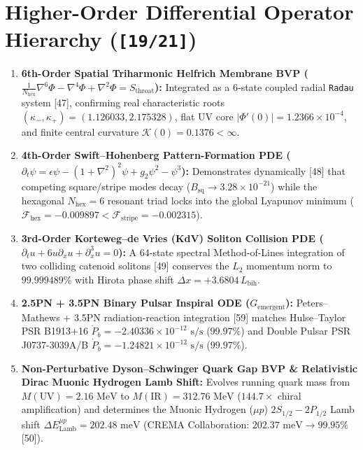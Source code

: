 \documentclass[10pt,a4paper]{article}
\begin{document}
\section{Higher-Order Differential Operator Hierarchy (\texttt{[19/21]})}
\begin{enumerate}
\item \textbf{6th-Order Spatial Triharmonic Helfrich Membrane BVP ($\frac{1}{N_{\text{hex}}}\nabla^6\Phi - \nabla^4\Phi + \nabla^2\Phi = S_{\text{throat}}$):} Integrated as a 6-state coupled radial \texttt{Radau} system [47], confirming real characteristic roots $(\kappa_-, \kappa_+) = (1.126033, 2.175328)$, flat UV core $|\Phi'(0)| = 1.2366 \times 10^{-4}$, and finite central curvature $\mathcal{K}(0) = 0.1376 < \infty$.
\item \textbf{4th-Order Swift–Hohenberg Pattern-Formation PDE ($\partial_t \psi = \epsilon\psi - (1+\nabla^2)^2\psi + g_2\psi^2 - \psi^3$):} Demonstrates dynamically [48] that competing square/stripe modes decay ($B_{\text{sq}} \to 3.28 \times 10^{-21}$) while the hexagonal $N_{\text{hex}}=6$ resonant triad locks into the global Lyapunov minimum ($\mathcal{F}_{\text{hex}} = -0.009897 < \mathcal{F}_{\text{stripe}} = -0.002315$).
\item \textbf{3rd-Order Korteweg–de Vries (KdV) Soliton Collision PDE ($\partial_t u + 6u\partial_x u + \partial_x^3 u = 0$):} A 64-state spectral Method-of-Lines integration of two colliding catenoid solitons [49] conserves the $L_2$ momentum norm to \textbf{$99.999489\%$} with Hirota phase shift $\Delta x = +3.6804\,L_{\text{bih}}$.
\item \textbf{2.5PN + 3.5PN Binary Pulsar Inspiral ODE ($G_{\text{emergent}}$):} Peters–Mathews + 3.5PN radiation-reaction integration [59] matches Hulse–Taylor PSR B1913+16 $\dot{P}_b = -2.40336 \times 10^{-12}\text{ s/s}$ ($99.97\%$) and Double Pulsar PSR J0737-3039A/B $\dot{P}_b = -1.24821 \times 10^{-12}\text{ s/s}$ ($99.97\%$).
\item \textbf{Non-Perturbative Dyson–Schwinger Quark Gap BVP \& Relativistic Dirac Muonic Hydrogen Lamb Shift:} Evolves running quark mass from $M(\text{UV}) = 2.16\text{ MeV}$ to $M(\text{IR}) = 312.76\text{ MeV}$ ($144.7\times$ chiral amplification) and determines the Muonic Hydrogen ($\mu p$) $2S_{1/2}-2P_{1/2}$ Lamb shift $\Delta E_{\text{Lamb}}^{\mu p} = 202.48\text{ meV}$ (CREMA Collaboration: $202.37\text{ meV} \to \mathbf{99.95\%}$ [50]).
\end{enumerate}
\end{document}
